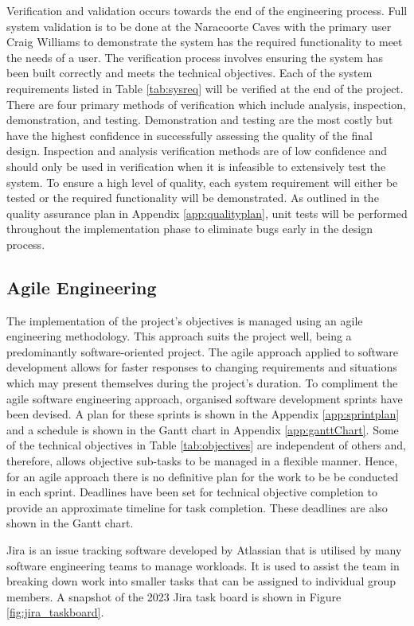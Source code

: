Verification and validation occurs towards the end of the engineering process. Full system validation is to be done at the Naracoorte Caves with the primary user Craig Williams to demonstrate the system has the required functionality to meet the needs of a user. The verification process involves ensuring the system has been built correctly and meets the technical objectives. Each of the system requirements listed in Table \ref{tab:sysreq} will be verified at the end of the project. There are four primary methods of verification which include analysis, inspection, demonstration, and testing. Demonstration and testing are the most costly but have the highest confidence in successfully assessing the quality of the final design. Inspection and analysis verification methods are of low confidence and should only be used in verification when it is infeasible to extensively test the system. To ensure a high level of quality, each system requirement will either be tested or the required functionality will be demonstrated. As outlined in the quality assurance plan in Appendix \ref{app:qualityplan}, unit tests will be performed throughout the implementation phase to eliminate bugs early in the design process.

\subsection{Agile Engineering}
\label{agile_software_engineering}
The implementation of the project's objectives is managed using an agile engineering methodology. This approach suits the project well, being a predominantly software-oriented project. The agile approach applied to software development allows for faster responses to changing requirements and situations which may present themselves during the project's duration. To compliment the agile software engineering approach, organised software development sprints have been devised. A plan for these sprints is shown in the Appendix \ref{app:sprintplan} and a schedule is shown in the Gantt chart in Appendix \ref{app:ganttChart}. Some of the technical objectives in Table \ref{tab:objectives} are independent of others and, therefore, allows objective sub-tasks to be managed in a flexible manner. Hence, for an agile approach there is no definitive plan for the work to be be conducted in each sprint. Deadlines have been set for technical objective completion to provide an approximate timeline for task completion. These deadlines are also shown in the Gantt chart. 

Jira is an issue tracking software developed by Atlassian that is utilised by many software engineering teams to manage workloads. It is used to assist the team in breaking down work into smaller tasks that can be assigned to individual group members. A snapshot of the 2023 Jira task board is shown in Figure \ref{fig:jira_taskboard}.

